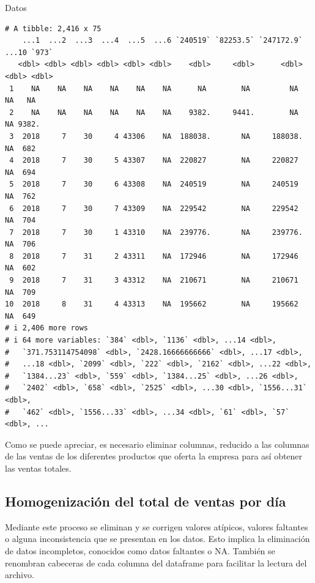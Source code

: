 \documentclass[
  us-letterpaper,
]{scrreprt}
\newenvironment{Shaded}{\begin{snugshade}}{\end{snugshade}}
\newcommand{\NormalTok}[1]{\textcolor[rgb]{0.00,0.23,0.31}{#1}}
\theoremstyle{definition}
\theoremstyle{plain}
\theoremstyle{plain}
\theoremstyle{remark}
\begin{document}
\begin{Shaded}
\begin{Highlighting}[]
\NormalTok{Datos}
\end{Highlighting}
\end{Shaded}

\begin{verbatim}
# A tibble: 2,416 x 75
    ...1  ...2  ...3  ...4  ...5  ...6 `240519` `82253.5` `247172.9` ...10 `973`
   <dbl> <dbl> <dbl> <dbl> <dbl> <dbl>    <dbl>     <dbl>      <dbl> <dbl> <dbl>
 1    NA    NA    NA    NA    NA    NA      NA        NA         NA     NA   NA 
 2    NA    NA    NA    NA    NA    NA    9382.     9441.        NA     NA 9382.
 3  2018     7    30     4 43306    NA  188038.       NA     188038.    NA  682 
 4  2018     7    30     5 43307    NA  220827        NA     220827     NA  694 
 5  2018     7    30     6 43308    NA  240519        NA     240519     NA  762 
 6  2018     7    30     7 43309    NA  229542        NA     229542     NA  704 
 7  2018     7    30     1 43310    NA  239776.       NA     239776.    NA  706 
 8  2018     7    31     2 43311    NA  172946        NA     172946     NA  602 
 9  2018     7    31     3 43312    NA  210671        NA     210671     NA  709 
10  2018     8    31     4 43313    NA  195662        NA     195662     NA  649 
# i 2,406 more rows
# i 64 more variables: `384` <dbl>, `1136` <dbl>, ...14 <dbl>,
#   `371.753114754098` <dbl>, `2428.16666666666` <dbl>, ...17 <dbl>,
#   ...18 <dbl>, `2099` <dbl>, `222` <dbl>, `2162` <dbl>, ...22 <dbl>,
#   `1384...23` <dbl>, `559` <dbl>, `1384...25` <dbl>, ...26 <dbl>,
#   `2402` <dbl>, `658` <dbl>, `2525` <dbl>, ...30 <dbl>, `1556...31` <dbl>,
#   `462` <dbl>, `1556...33` <dbl>, ...34 <dbl>, `61` <dbl>, `57` <dbl>, ...
\end{verbatim}

Como se puede apreciar, es necesario eliminar columnas, reducido a las
columnas de las ventas de los diferentes productos que oferta la empresa
para así obtener las ventas totales.

\subsection{Homogenización del total de ventas por
día}\label{homogenizaciuxf3n-del-total-de-ventas-por-duxeda}

Mediante este proceso se eliminan y se corrigen valores atípicos,
valores faltantes o alguna inconsistencia que se presentan en los datos.
Esto implica la eliminación de datos incompletos, conocidos como datos
faltantes o NA. También se renombran cabeceras de cada columna del
dataframe para facilitar la lectura del archivo.
\end{document}

